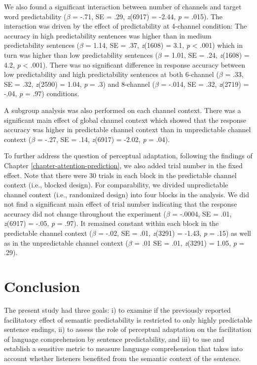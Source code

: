 \documentclass[a4paper, nobind]{templates/ociamthesis}
\begin{document}
We also found a significant interaction between number of channels and target word predictability
(\(\beta\) = -.71, SE = .29, \emph{z}(6917) = -2.44, \emph{p} = .015).
The interaction was driven by the effect of predictability at 4-channel condition:
The accuracy in high predictability sentences was higher than in medium predictability sentences
(\(\beta\) = 1.14, SE = .37, \emph{z}(1608) = 3.1, \emph{p} \textless{} .001) which in turn was higher than low predictability sentences
(\(\beta\) = 1.01, SE = .24, \emph{z}(1608) = 4.2, \emph{p} \textless{} .001).
There was no significant difference in response accuracy between low predictability and high predictability sentences
at both 6-channel (\(\beta\) = .33, SE = .32, \emph{z}(2590) = 1.04, \emph{p} = .3)
and 8-channel (\(\beta\) = -.014, SE = .32, \emph{z}(2719) = -.04, \emph{p} = .97) conditions.

A subgroup analysis was also performed on each channel context.
There was a significant main effect of global channel context which showed that the response accuracy was higher in predictable channel context than in unpredictable channel context (\(\beta\) = -.27, SE = .14, \emph{z}(6917) = -2.02, \emph{p} = .04).

To further address the question of perceptual adaptation, following the findings of Chapter \ref{chapter-attention-prediction}, we also added trial number in the fixed effect.
Note that there were 30 trials in each block in the predictable channel context (i.e., blocked design).
For comparability, we divided unpredictable channel context (i.e., randomized design) into four blocks in the analysis.
We did not find a significant main effect of trial number indicating that the response accuracy did not change throughout the experiment (\(\beta\) = -.0004, SE = .01, \emph{z}(6917) = -.05, \emph{p} = .97).
It remained constant within each block in the predictable channel context (\(\beta\) = -.02, SE = .01, \emph{z}(3291) = -1.43, \emph{p} = .15) as well as in the unpredictable channel context (\(\beta\) = .01 SE = .01, \emph{z}(3291) = 1.05, \emph{p} = .29).

\hypertarget{conclusion-1}{%
\section{Conclusion}\label{conclusion-1}}

The present study had three goals: i) to examine if the previously reported facilitatory effect of semantic predictability is restricted to only highly predictable sentence endings,
ii) to assess the role of perceptual adaptation on the facilitation of language comprehension by sentence predictability, and
iii) to use and establish a sensitive metric to measure language comprehension that takes into account whether listeners benefited from the semantic context of the sentence.
\end{document}
